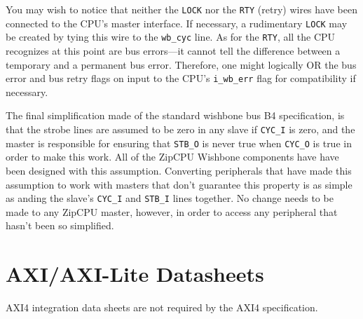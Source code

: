 \documentclass{gqtekspec}
\begin{document}
You may wish to notice that neither the {\tt LOCK} nor the {\tt RTY} (retry)
wires have been connected to the CPU's master interface.  If necessary, a
rudimentary {\tt LOCK} may be created by tying this wire to the {\tt wb\_cyc}
line.  As for the {\tt RTY}, all the CPU recognizes at this point are bus
errors---it cannot tell the difference between a temporary and a permanent bus
error.  Therefore, one might logically OR the bus error and bus retry flags on
input to the CPU's {\tt i\_wb\_err} flag for compatibility if necessary.

The final simplification made of the standard wishbone bus B4 specification, is
that the strobe lines are assumed to be zero in any slave if {\tt CYC\_I} is
zero, and the master is responsible for ensuring that {\tt STB\_O} is never
true when {\tt CYC\_O} is true in order to make this work.  All of the ZipCPU
Wishbone components have have been designed with this assumption.
Converting peripherals that have made this assumption to work with masters
that don't guarantee this property is as simple as anding the slave's
{\tt CYC\_I} and {\tt STB\_I} lines together.  No change needs to be made to
any ZipCPU master, however, in order to access any peripheral that hasn't been
so simplified.
\section{AXI/AXI-Lite Datasheets}\label{sec:axi}
AXI4 integration data sheets are not required by the AXI4 specification.

\end{document}
